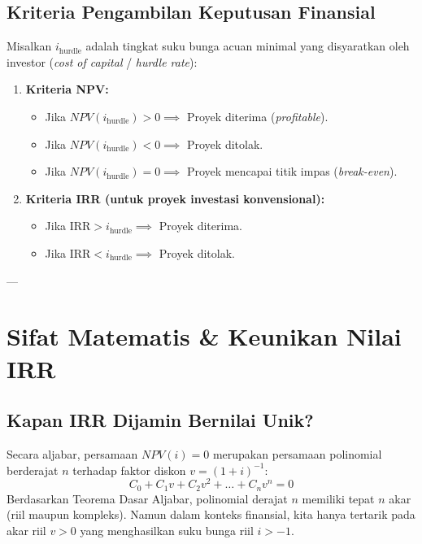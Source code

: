 \documentclass[11pt,a4paper]{article}
\begin{document}
\subsection{Kriteria Pengambilan Keputusan Finansial}
Misalkan $i_{\text{hurdle}}$ adalah tingkat suku bunga acuan minimal yang disyaratkan oleh investor (\textit{cost of capital} / \textit{hurdle rate}):
\begin{enumerate}[label=(\alph*)]
    \item \textbf{Kriteria NPV:}
    \begin{itemize}
        \item Jika $NPV(i_{\text{hurdle}}) > 0 \implies$ Proyek diterima (\textit{profitable}).
        \item Jika $NPV(i_{\text{hurdle}}) < 0 \implies$ Proyek ditolak.
        \item Jika $NPV(i_{\text{hurdle}}) = 0 \implies$ Proyek mencapai titik impas (\textit{break-even}).
    \end{itemize}
    \item \textbf{Kriteria IRR (untuk proyek investasi konvensional):}
    \begin{itemize}
        \item Jika $\text{IRR} > i_{\text{hurdle}} \implies$ Proyek diterima.
        \item Jika $\text{IRR} < i_{\text{hurdle}} \implies$ Proyek ditolak.
    \end{itemize}
\end{enumerate}

---

\section{Sifat Matematis \& Keunikan Nilai IRR}

\subsection{Kapan IRR Dijamin Bernilai Unik?}

Secara aljabar, persamaan $NPV(i) = 0$ merupakan persamaan polinomial berderajat $n$ terhadap faktor diskon $v = (1+i)^{-1}$:
\begin{equation}
    C_0 + C_1 v + C_2 v^2 + \dots + C_n v^n = 0
\end{equation}
Berdasarkan Teorema Dasar Aljabar, polinomial derajat $n$ memiliki tepat $n$ akar (riil maupun kompleks). Namun dalam konteks finansial, kita hanya tertarik pada akar riil $v > 0$ yang menghasilkan suku bunga riil $i > -1$.
\end{document}
